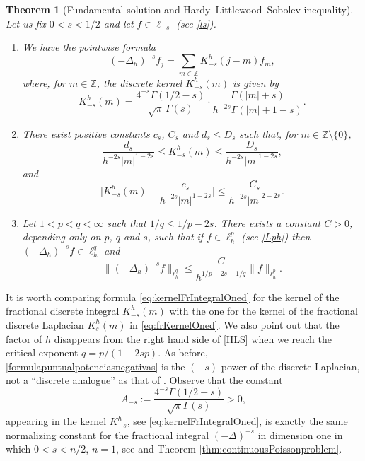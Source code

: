 \documentclass[a4paper,11pt,reqno]{amsart}
\newcommand{\Z}{\mathbb{Z}}
\newtheorem{thm}{Theorem}[section]
\theoremstyle{definition}
\numberwithin{equation}{section}
\begin{document}
\begin{thm}[Fundamental solution and Hardy--Littlewood--Sobolev inequality]\label{lem:kernelFractionalIntegral}
Let us fix $0<s<1/2$ and let $f\in\ell_{-s}$ (see \eqref{ls}).
\begin{enumerate}[$(a)$]
\item We have the pointwise formula
\begin{equation}
\label{formulapuntualpotenciasnegativas}
(-\Delta_h)^{-s}f_j=\sum_{m\in\Z}K^h_{-s}(j-m)f_{m},
\end{equation}
where, for $m\in\Z$, the discrete kernel $K^h_{-s}(m)$ is given by
\begin{equation}
\label{eq:kernelFrIntegralOned}
K_{-s}^h(m)=\frac{4^{-s}\Gamma(1/2-s)}{\sqrt{\pi}\,\Gamma(s)}\cdot\frac{\Gamma(|m|+s)}{h^{-2s}\Gamma(|m|+1-s)}.
\end{equation}
\item There exist positive constants  $c_s$, $C_s$ and $d_s\leq D_s$
such that, for $m\in\Z\setminus\{0\}$,
\begin{equation}
\label{eq:growthFractional0}
\frac{d_s}{h^{-2s}|m|^{1-2s}}\leq K_{-s}^h(m)\leq\frac{D_s}{h^{-2s}|m|^{1-2s}},
\end{equation}
and
\begin{equation}
\label{eq:growthFractional}
\bigg| K_{-s}^h(m) - \frac{c_{s}}{h^{-2s}|m|^{1-2s}}\bigg| \le \frac{C_{s}}{h^{-2s}|m|^{2-2s}}.
\end{equation}
\item Let $1<p<q<\infty$ such that $1/q\leq1/p-2s$.
There exists a constant $C>0$, depending only on $p$, $q$ and $s$, such that if $f\in\ell^p_h$
(see \eqref{Lph})
then $(-\Delta_h)^{-s}f\in\ell^q_h$ and
\begin{equation}
\label{HLS}
\|(-\Delta_h)^{-s}f\|_{\ell^q_h} \leq\frac{C}{h^{1/p-2s-1/q}}\|f\|_{\ell^p_h}.
\end{equation}
\end{enumerate}
\end{thm}

It is worth comparing formula \eqref{eq:kernelFrIntegralOned} for the
kernel of the fractional discrete integral $K_{-s}^h(m)$
with the one for the kernel of the fractional discrete Laplacian $K_s^h(m)$ in \eqref{eq:frKernelOned}.
We also point out that the factor of $h$ disappears from the right hand side of \eqref{HLS}
when we reach the critical exponent $q=p/(1-2sp)$. As before, \eqref{formulapuntualpotenciasnegativas}
is the $(-s)$-power of the discrete Laplacian, not a ``discrete analogue'' as that of \cite{Stein-Wainger}.
Observe that the constant
\begin{equation}
\label{constantfractionalintegral}
A_{-s}:=\frac{4^{-s}\Gamma(1/2-s)}{\sqrt{\pi}\Gamma(s)}>0,
\end{equation}
appearing in the kernel $K_{-s}^h$, see \eqref{eq:kernelFrIntegralOned},
is exactly the same normalizing constant for the fractional integral
$(-\Delta)^{-s}$ in dimension one in which $0<s<n/2$, $n=1$,
see \cite{StSingular} and Theorem \ref{thm:continuousPoissonproblem}.
\end{document}

